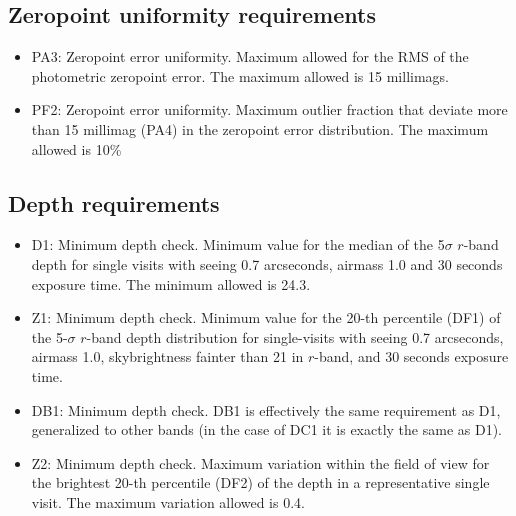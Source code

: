\documentclass[\docopts]{\docclass}
\begin{document}
\subsection{Zeropoint uniformity requirements}
\begin{itemize}
\item PA3: Zeropoint error uniformity. Maximum allowed for the RMS of the photometric zeropoint error. The maximum allowed is 15 millimags.
\item PF2: Zeropoint error uniformity. Maximum outlier fraction that deviate more than 15 millimag (PA4) in the zeropoint error distribution. The maximum allowed is 10\%
\end{itemize}

\subsection{Depth requirements}
\begin{itemize}
\item D1: Minimum depth check. Minimum value for the median of the 5$\sigma$ $r$-band depth for single visits with seeing 0.7 arcseconds, airmass 1.0 and 30 seconds exposure time. The minimum allowed is 24.3.
\item Z1: Minimum depth check. Minimum value for the 20-th percentile (DF1) of the 5-$\sigma$ $r$-band depth distribution for single-visits with seeing 0.7 arcseconds, airmass 1.0, skybrightness fainter than 21 in $r$-band, and 30 seconds exposure time.
\item DB1: Minimum depth check. DB1 is effectively the same requirement as D1, generalized to other bands (in the case of DC1 it is exactly the same as D1).
\item Z2: Minimum depth check. Maximum variation within the field of view for the brightest 20-th percentile (DF2) of the depth in a representative single visit. The maximum variation allowed is 0.4.
\end{itemize}
\end{document}
